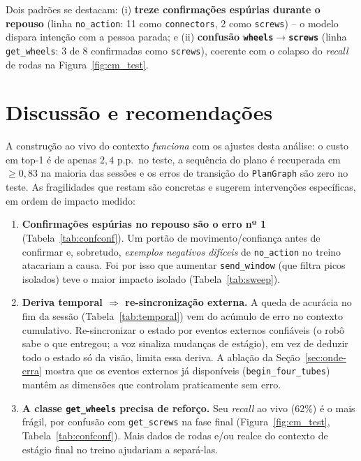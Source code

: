 \documentclass[11pt]{article}
\begin{document}
Dois padrões se destacam: (i) \textbf{treze confirmações espúrias durante o
repouso} (linha \texttt{no\_action}: 11 como \texttt{connectors}, 2 como
\texttt{screws}) -- o modelo dispara intenção com a pessoa parada; e (ii)
\textbf{confusão \texttt{wheels}$\to$\texttt{screws}} (linha \texttt{get\_wheels}:
3 de 8 confirmadas como \texttt{screws}), coerente com o colapso do \emph{recall}
de rodas na Figura~\ref{fig:cm_test}.

\section{Discussão e recomendações}
\label{sec:discussao}

A construção ao vivo do contexto \emph{funciona} com os ajustes desta análise: o
custo em top-1 é de apenas $2{,}4$ p.p.\ no teste, a sequência do plano é
recuperada em $\ge 0{,}83$ na maioria das sessões e os erros de transição do
\texttt{PlanGraph} são zero no teste. As fragilidades que restam são concretas e
sugerem intervenções específicas, em ordem de impacto medido:

\begin{enumerate}
  \item \textbf{Confirmações espúrias no repouso são o erro nº 1}
    (Tabela~\ref{tab:confconf}). Um portão de movimento/confiança antes de
    confirmar e, sobretudo, \emph{exemplos negativos difíceis} de
    \texttt{no\_action} no treino atacariam a causa. Foi por isso que aumentar
    \texttt{send\_window} (que filtra picos isolados) teve o maior impacto isolado
    (Tabela~\ref{tab:sweep}).
  \item \textbf{Deriva temporal $\Rightarrow$ re-sincronização externa.} A queda
    de acurácia no fim da sessão (Tabela~\ref{tab:temporal}) vem do acúmulo de
    erro no contexto cumulativo. Re-sincronizar o estado por eventos externos
    confiáveis (o robô sabe o que entregou; a voz sinaliza mudanças de estágio),
    em vez de deduzir todo o estado só da visão, limita essa deriva. A ablação da
    Seção~\ref{sec:onde-erra} mostra que os eventos externos já disponíveis
    (\texttt{begin\_four\_tubes}) mantêm as dimensões que controlam praticamente
    sem erro.
  \item \textbf{A classe \texttt{get\_wheels} precisa de reforço.} Seu
    \emph{recall} ao vivo (62\%) é o mais frágil, por confusão com
    \texttt{get\_screws} na fase final (Figura~\ref{fig:cm_test},
    Tabela~\ref{tab:confconf}). Mais dados de rodas e/ou realce do contexto de
    estágio final no treino ajudariam a separá-las.
\end{enumerate}
\end{document}
